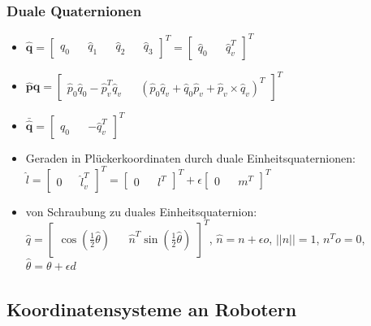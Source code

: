\documentclass[11pt]{article}
\begin{document}
\subsubsection{Duale Quaternionen}
\begin{itemize}
    \item $\boldsymbol{\hat{q}} = \begin{bmatrix} \hat{q}_0 && \hat{q}_1 && \hat{q}_2 && \hat{q}_3 \end{bmatrix}^T = \begin{bmatrix} \hat{q}_0 && \hat{q}_v^T \end{bmatrix}^T$
    \item $\boldsymbol{\hat{p}}\boldsymbol{\hat{q}} = \begin{bmatrix} \hat{p}_0 \hat{q}_0 - \hat{p}_v^T \hat{q}_v && (\hat{p}_0 \hat{q}_v + \hat{q}_0 \hat{p}_v + \hat{p}_v \times \hat{q}_v)^T \end{bmatrix}^T$
    \item $\boldsymbol{\bar{\hat{q}}} = \begin{bmatrix} \hat{q}_0 && -\hat{q}_v^T \end{bmatrix}^T$
    \item Geraden in Plückerkoordinaten durch duale Einheitsquaternionen: $\hat{l} = \begin{bmatrix} 0 && \hat{l}_v^T \end{bmatrix}^T = \begin{bmatrix} 0 && l^T \end{bmatrix}^T + \epsilon \begin{bmatrix} 0 && m^T \end{bmatrix}^T$
    \item von Schraubung zu duales Einheitsquaternion: $\hat{q} = \begin{bmatrix} \cos{(\frac{1}{2}\hat{\theta})} && \hat{n}^T \sin{(\frac{1}{2} \hat{\theta})} \end{bmatrix}^T$, $\hat{n} = n + \epsilon o$, $||n|| = 1$, $n^T o=0$, $\hat{\theta} = \theta + \epsilon d$
\end{itemize}

\subsection{Koordinatensysteme an Robotern}
\end{document}
